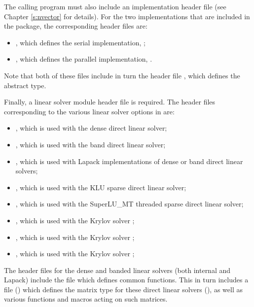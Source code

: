 The calling program must also include an {\nvector} implementation header file
(see Chapter \ref{s:nvector} for details).
For the two {\nvector} implementations that are included in the {\kinsol} package,
the corresponding header files are:
%
\begin{itemize}
\item {}, 
  which defines the serial implementation, {\nvecs};
\item {}, 
  which defines the parallel {\mpi} implementation, {\nvecp}.
\end{itemize}
%
Note that both of these files include in turn the header file , which 
defines the abstract  type. 

Finally, a linear solver module header file is required. 
The header files corresponding to the various linear solver options in
{\kinsol} are:
\begin{itemize}
\item {},
  which is used with the dense direct linear solver;

\item {}, 
  which is used with the band direct linear solver;

\item {},
  which is used with Lapack implementations of dense or band direct linear solvers;

\item {},
  which is used with the KLU sparse direct linear solver;

\item {},
  which is used with the SuperLU\_MT threaded sparse direct linear solver;

\item {}, 
  which is used with the Krylov solver {\spgmr};

\item {}, 
  which is used with the Krylov solver {\spbcg};

\item {}, 
  which is used with the Krylov solver {\sptfqmr};

\end{itemize}

The header files for the dense and banded linear solvers (both
internal and Lapack) include the file  which
defines common functions.  This in turn includes a file
() which defines the matrix type for these
direct linear solvers (), as well as various functions and
macros acting on such matrices.

